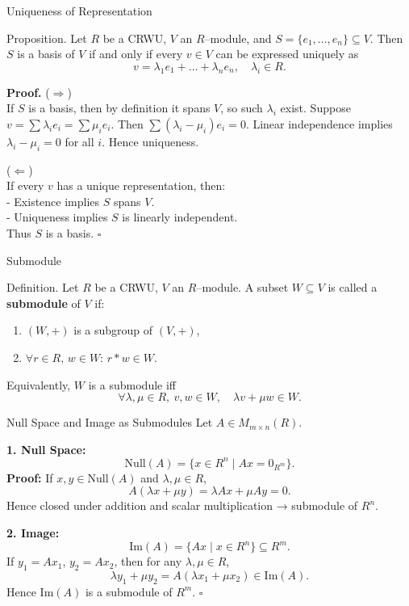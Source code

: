 \documentclass[11pt,aspectratio=43,ignorenonframetext,t]{beamer}
\begin{document}
\begin{frame}{Uniqueness of Representation}
\begin{block}{Proposition.}  
Let $R$ be a CRWU, $V$ an $R$–module, and $S=\{e_1,\dots,e_n\}\subseteq V$.  
Then $S$ is a basis of $V$ if and only if every $v\in V$ can be expressed uniquely as
\[
v=\lambda_1 e_1+\dots+\lambda_n e_n,\quad \lambda_i\in R.
\]  
\end{block}

\textbf{Proof.}
($\Rightarrow$)\\  
If $S$ is a basis, then by definition it spans $V$, so such $\lambda_i$ exist.  
Suppose $v=\sum \lambda_i e_i = \sum \mu_i e_i$. Then $\sum (\lambda_i-\mu_i)e_i=0$.  
Linear independence implies $\lambda_i-\mu_i=0$ for all $i$. Hence uniqueness.

($\Leftarrow$) \\ 
If every $v$ has a unique representation, then:\\
- Existence implies $S$ spans $V$.\\
- Uniqueness implies $S$ is linearly independent.  \\
Thus $S$ is a basis. $\square$
\end{frame}


\begin{frame}{Submodule}
\begin{block}{Definition.}  
Let $R$ be a CRWU, $V$ an $R$–module.  
A subset $W\subseteq V$ is called a \textbf{submodule} of $V$ if:
\begin{enumerate}
  \item $(W,+)$ is a subgroup of $(V,+)$,
  \item $\forall r\in R,\, w\in W:\, r*w\in W.$
\end{enumerate}

Equivalently, $W$ is a submodule iff
\[
\forall \lambda,\mu\in R,\ v,w\in W,\quad \lambda v+\mu w\in W.
\]
\end{block}
\end{frame}

\begin{frame}{Null Space and Image as Submodules}
Let $A\in M_{m\times n}(R)$.

\textbf{1. Null Space:}
\[
\mathrm{Null}(A)=\{x\in R^n\mid Ax=0_{R^m}\}.
\]
\textbf{Proof:}
If $x,y\in\mathrm{Null}(A)$ and $\lambda,\mu\in R$,
\[
A(\lambda x+\mu y)=\lambda A x+\mu A y=0.
\]
Hence closed under addition and scalar multiplication → submodule of $R^n$.

\textbf{2. Image:}
\[
\mathrm{Im}(A)=\{Ax\mid x\in R^n\}\subseteq R^m.
\]
If $y_1=Ax_1$, $y_2=Ax_2$, then for any $\lambda,\mu\in R$,
\[
\lambda y_1+\mu y_2=A(\lambda x_1+\mu x_2)\in \mathrm{Im}(A).
\]
Hence $\mathrm{Im}(A)$ is a submodule of $R^m$. $\square$
\end{frame}
\end{document}
